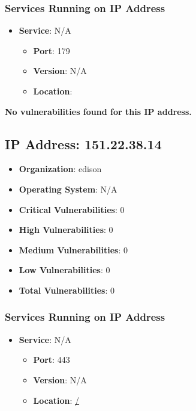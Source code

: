 \documentclass{article}
\begin{document}
\subsubsection*{Services Running on IP Address}

\begin{itemize}
    
        \item \textbf{Service}: N/A
        \begin{itemize}
            \item \textbf{Port}: 179
            \item \textbf{Version}:  N/A 
            \item \textbf{Location}: \href{  }{  }
        \end{itemize}
    
\end{itemize}


\textbf{No vulnerabilities found for this IP address.}




\clearpage



\subsection{IP Address: 151.22.38.14}

\begin{itemize}
    \item \textbf{Organization}: edison
    \item \textbf{Operating System}:  N/A 
    \item \textbf{Critical Vulnerabilities}: 0
    \item \textbf{High Vulnerabilities}: 0
    \item \textbf{Medium Vulnerabilities}: 0
    \item \textbf{Low Vulnerabilities}: 0
    \item \textbf{Total Vulnerabilities}: 0
\end{itemize}

\subsubsection*{Services Running on IP Address}

\begin{itemize}
    
        \item \textbf{Service}: N/A
        \begin{itemize}
            \item \textbf{Port}: 443
            \item \textbf{Version}:  N/A 
            \item \textbf{Location}: \href{ / }{ / }
        \end{itemize}
    
\end{itemize}
\end{document}
